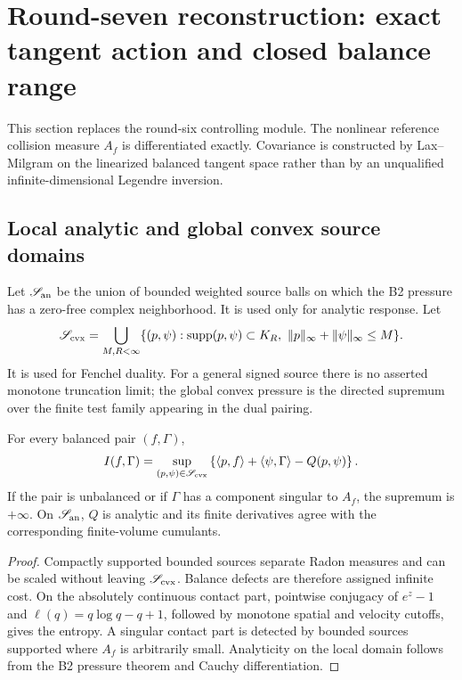 \section{Round-seven reconstruction: exact tangent action and closed balance range}
\label{sec:r7-b3}

This section replaces the round-six controlling module.  The nonlinear
reference collision measure $A_f$ is differentiated exactly.  Covariance is
constructed by Lax--Milgram on the linearized balanced tangent space rather
than by an unqualified infinite-dimensional Legendre inversion.

\subsection{Local analytic and global convex source domains}

Let $\mathscr S_{\rm an}$ be the union of bounded weighted source balls on
which the B2 pressure has a zero-free complex neighborhood.  It is used only
for analytic response.  Let
\[
 \mathscr S_{\rm cvx}=
 \bigcup_{M,R<\infty}
 \{(p,\psi):\operatorname{supp}(p,\psi)\subset K_R,
   \ \|p\|_\infty+\|\psi\|_\infty\le M\}.
\]
It is used for Fenchel duality.  For a general signed source there is no
asserted monotone truncation limit; the global convex pressure is the directed
supremum over the finite test family appearing in the dual pairing.

\begin{theorem}
\label{thm:r7-b3-duality}
For every balanced pair $(f,\Gamma)$,
\[
 I(f,\Gamma)=
 \sup_{(p,\psi)\in\mathscr S_{\rm cvx}}
 \left\{\langle p,f\rangle+\langle\psi,\Gamma\rangle
       -Q(p,\psi)\right\}.
\]
If the pair is unbalanced or if $\Gamma$ has a component singular to $A_f$,
the supremum is $+\infty$.  On $\mathscr S_{\rm an}$, $Q$ is analytic and its
finite derivatives agree with the corresponding finite-volume cumulants.
\end{theorem}

\begin{proof}
Compactly supported bounded sources separate Radon measures and can be scaled
without leaving $\mathscr S_{\rm cvx}$.  Balance defects are therefore assigned
infinite cost.  On the absolutely continuous contact part, pointwise conjugacy
of $e^z-1$ and $\ell(q)=q\log q-q+1$, followed by monotone spatial and velocity
cutoffs, gives the entropy.  A singular contact part is detected by bounded
sources supported where $A_f$ is arbitrarily small.  Analyticity on the local
domain follows from the B2 pressure theorem and Cauchy differentiation.
\end{proof}


